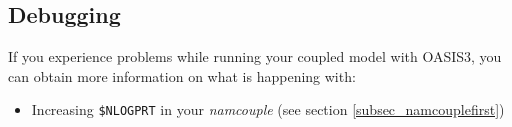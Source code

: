 \subsection{Debugging}

If you experience problems while running your coupled model with OASIS3, you can obtain more information on what is happening with:
\begin{itemize}
\item Increasing {\tt \$NLOGPRT} in your {\it namcouple} (see section \ref{subsec_namcouplefirst})
\end{itemize}

